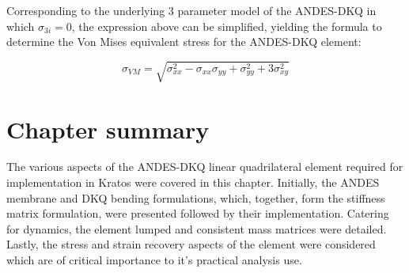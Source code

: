 Corresponding to the underlying 3 parameter model of the ANDES-DKQ in which $\sigma_{3i} = 0$, the expression above can be simplified, yielding the formula to determine the Von Mises equivalent stress for the ANDES-DKQ element:

\begin{equation} 
\sigma_{VM} = 
\sqrt{
	\sigma_{xx}^2
	- \sigma_{xx}\sigma_{yy}
	+ \sigma_{yy}^2
	+ 3\sigma_{xy}^2
}
\label{eqqrec6}
\end{equation}

\section{Chapter summary}
The various aspects of the ANDES-DKQ linear quadrilateral element required for implementation in Kratos were covered in this chapter. Initially, the ANDES membrane and DKQ bending formulations, which, together, form the stiffness matrix formulation, were presented followed by their implementation. Catering for dynamics, the element lumped and consistent mass matrices were detailed. Lastly, the stress and strain recovery aspects of the element were considered which are of critical importance to it's practical analysis use.